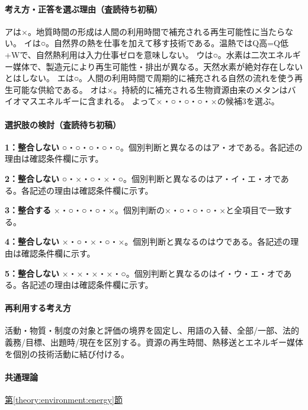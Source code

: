 \paragraph{考え方・正答を選ぶ理由（査読待ち初稿）} アは×。地質時間の形成は人間の利用時間で補充される再生可能性に当たらない。 イは○。自然界の熱を仕事を加えて移す技術である。温熱ではQ高=Q低+Wで、自然熱利用は入力仕事ゼロを意味しない。 ウは○。水素は二次エネルギー媒体で、製造元により再生可能性・排出が異なる。天然水素が絶対存在しないとはしない。 エは○。人間の利用時間で周期的に補充される自然の流れを使う再生可能な供給である。 オは×。持続的に補充される生物資源由来のメタンはバイオマスエネルギーに含まれる。 よって×・○・○・○・×の候補3を選ぶ。

\paragraph{選択肢の検討（査読待ち初稿）}\mbox{}\par

\noindent\textbf{1：整合しない} ○・○・○・○・○。個別判断と異なるのはア・オである。各記述の理由は確認条件欄に示す。\par

\noindent\textbf{2：整合しない} ○・×・○・×・○。個別判断と異なるのはア・イ・エ・オである。各記述の理由は確認条件欄に示す。\par

\noindent\textbf{3：整合する} ×・○・○・○・×。個別判断の×・○・○・○・×と全項目で一致する。\par

\noindent\textbf{4：整合しない} ×・○・×・○・×。個別判断と異なるのはウである。各記述の理由は確認条件欄に示す。\par

\noindent\textbf{5：整合しない} ×・×・×・×・○。個別判断と異なるのはイ・ウ・エ・オである。各記述の理由は確認条件欄に示す。\par

\paragraph{再利用する考え方} 活動・物質・制度の対象と評価の境界を固定し、用語の入替、全部/一部、法的義務/目標、出題時/現在を区別する。資源の再生時間、熱移送とエネルギー媒体を個別の技術活動に結び付ける。

\paragraph{共通理論} \hyperref[theory:environment:energy]{第\ref*{theory:environment:energy}節}

